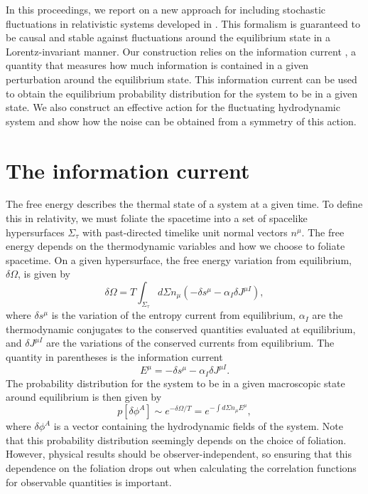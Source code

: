 \documentclass{webofc}
\begin{document}
In this proceedings, we report on a new approach for including stochastic fluctuations in relativistic systems developed in  \cite{Mullins:2023tjg,Mullins:2023ott}. This formalism is guaranteed to be causal and stable against fluctuations around the equilibrium state in a Lorentz-invariant manner. Our construction relies on the information current \cite{Gavassino:2021kjm}, a quantity that measures how much information is contained in a given perturbation around the equilibrium state. This information current can be used to obtain the equilibrium probability distribution for the system to be in a given state. We also construct an effective action for the fluctuating hydrodynamic system and show how the noise can be obtained from a symmetry of this action. 

\section{The information current}

The free energy describes the thermal state of a system at a given time. To define this in relativity, we must foliate the spacetime into a set of spacelike hypersurfaces $\Sigma_{\tau}$ with past-directed timelike unit normal vectors $n^{\mu}$. The free energy depends on the thermodynamic variables and how we choose to foliate spacetime. On a given hypersurface, the free energy variation from equilibrium, $\delta \Omega$, is given by 
\begin{equation}
    \delta \Omega = T \int_{\Sigma_{\tau}} d\Sigma n_{\mu} \left( - \delta s^{\mu} - \alpha_I \delta J^{\mu I} \right) ,
\end{equation}
where $\delta s^{\mu}$ is the variation of the entropy current from equilibrium, $\alpha_I$ are the thermodynamic conjugates to the conserved quantities evaluated at equilibrium, and $\delta J^{\mu I}$ are the variations of the conserved currents from equilibrium. The quantity in parentheses is the information current \cite{Gavassino:2021kjm}
\begin{equation}
    E^{\mu} = - \delta s^{\mu} - \alpha_I \delta J^{\mu I} .
\end{equation}
The probability distribution for the system to be in a given macroscopic state around equilibrium is then given by 
\begin{equation} \label{Eq:Equilibrium_dist}
    p[\delta \phi^A] \sim e^{-\delta \Omega/T}= e^{- \int d\Sigma n_{\mu} E^{\mu}} ,
\end{equation}
where $\delta \phi^A$ is a vector containing the hydrodynamic fields of the system. Note that this probability distribution seemingly depends on the choice of foliation. However, physical results should be observer-independent, so ensuring that this dependence on the foliation drops out when calculating the correlation functions for observable quantities is important. 
\end{document}
